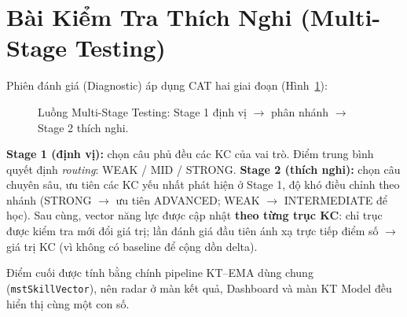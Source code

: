 \documentclass[12pt, a4paper]{report}
\begin{document}
\section{Bài Kiểm Tra Thích Nghi (Multi-Stage Testing)}
\label{sec:mst}

Phiên đánh giá (Diagnostic) áp dụng CAT hai giai đoạn (Hình~\ref{fig:mst}):

\begin{figure}[H]
  \centering
  \caption{Luồng Multi-Stage Testing: Stage 1 định vị $\to$ phân nhánh $\to$ Stage 2 thích nghi.}
  \label{fig:mst}
\end{figure}

\textbf{Stage 1 (định vị):} chọn câu phủ đều các KC của vai trò. Điểm trung bình quyết định \textit{routing}: WEAK / MID / STRONG. \textbf{Stage 2 (thích nghi):} chọn câu chuyên sâu, ưu tiên các KC yếu nhất phát hiện ở Stage 1, độ khó điều chỉnh theo nhánh (STRONG $\to$ ưu tiên ADVANCED; WEAK $\to$ INTERMEDIATE để học). Sau cùng, vector năng lực được cập nhật \textbf{theo từng trục KC}: chỉ trục được kiểm tra mới đổi giá trị; lần đánh giá đầu tiên ánh xạ trực tiếp điểm số $\to$ giá trị KC (vì không có baseline để cộng dồn delta).

Điểm cuối được tính bằng chính pipeline KT--EMA dùng chung (\texttt{mstSkillVector}), nên radar ở màn kết quả, Dashboard và màn KT Model đều hiển thị cùng một con số.
\end{document}
